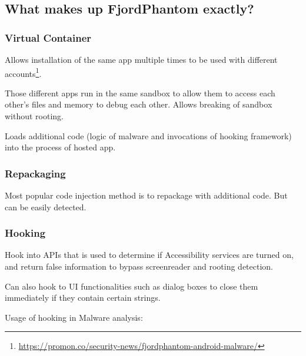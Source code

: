 \label{task:20240517_android}

\subsection{What makes up FjordPhantom exactly?}

\subsubsection{Virtual Container}

Allows installation of the same app multiple times to be used with different accounts\footnote{\url{https://promon.co/security-news/fjordphantom-android-malware/}}. 

Those different apps run in the same sandbox to allow them to access each other's files and memory to debug each other. Allows breaking of sandbox without rooting.

Loads additional code (logic of malware and invocations of hooking framework) into the process of hosted app.

\subsubsection{Repackaging}

Most popular code injection method is to repackage with additional code. But can be easily detected.

\subsubsection{Hooking}

Hook into APIs that is used to determine if Accessibility services are turned on, and return false information to bypass screenreader and rooting detection.

Can also hook to UI functionalities such as dialog boxes to close them immediately if they contain certain strings.

Usage of hooking in Malware analysis:

